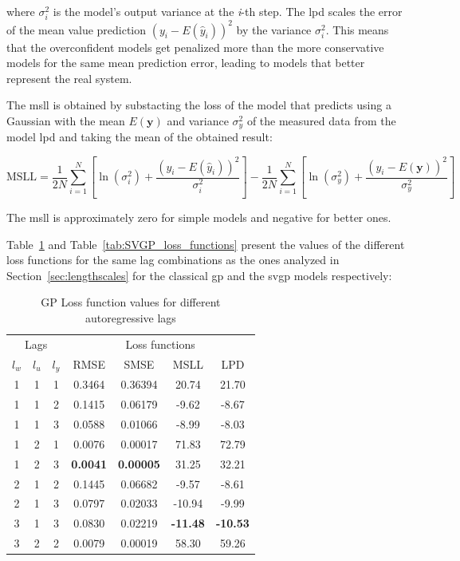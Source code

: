where $\sigma_i^2$ is the model's output variance at the \textit{i}-th step.
The \acrshort{lpd} scales the error of the mean value prediction $\left(y_i -
E(\hat{y}_i)\right)^{2}$ by the variance $\sigma_i^2$. This means that the
overconfident models get penalized more than the more conservative models for
the same mean prediction error, leading to models that better represent
the real system. 

The \acrfull{msll} is obtained by substacting the loss of the model that
predicts using a Gaussian with the mean $E(\boldsymbol{y})$ and variance
$\sigma_y^2$ of the measured data from the model \acrshort{lpd} and taking the
mean of the obtained result:

\begin{equation}
    \text{MSLL} = \frac{1}{2N}\sum_{i=1}^N\left[
        \ln{\left(\sigma_i^2\right) + \frac{\left(y_i -
        E\left(\hat{y}_i\right)\right)^2}{\sigma_i^2}}
    \right] - \frac{1}{2N}\sum_{i=1}^N\left[
        \ln{\left(\sigma_y^2\right) + \frac{\left(y_i -
        E\left(\boldsymbol{y}\right)\right)^2}{\sigma_y^2}}
    \right]
\end{equation}

The \acrshort{msll} is approximately zero for simple models and negative for
better ones.

Table~\ref{tab:GP_loss_functions} and Table~\ref{tab:SVGP_loss_functions}
present the values of the different loss functions for the same lag combinations
as the ones analyzed in Section~\ref{sec:lengthscales} for the classical
\acrshort{gp} and the \acrshort{svgp} models respectively: 

\begin{table}[ht]
\centering
    \begin{tabular}{||c c c|c c c c||}
        \hline
        \multicolumn{3}{||c|}{Lags} & \multicolumn{4}{c||}{Loss functions}\\
        $l_w$ & $l_u$ & $l_y$ & RMSE & SMSE & MSLL & LPD\\
        \hline \hline
        1 & 1 & 1 & 0.3464 & 0.36394 & 20.74 & 21.70 \\
        1 & 1 & 2 & 0.1415 & 0.06179 & -9.62 & -8.67 \\
        1 & 1 & 3 & 0.0588 & 0.01066 & -8.99 & -8.03 \\
        1 & 2 & 1 & 0.0076 & 0.00017 & 71.83 & 72.79 \\
        1 & 2 & 3 & \textbf{0.0041} & \textbf{0.00005} & 31.25 & 32.21 \\
        2 & 1 & 2 & 0.1445 & 0.06682 & -9.57 & -8.61 \\
        2 & 1 & 3 & 0.0797 & 0.02033 & -10.94 & -9.99 \\
        3 & 1 & 3 & 0.0830 & 0.02219 & \textbf{-11.48} & \textbf{-10.53} \\
        3 & 2 & 2 & 0.0079 & 0.00019 & 58.30 & 59.26 \\
        \hline
    \end{tabular}
\caption{GP Loss function values for different autoregressive lags}
\label{tab:GP_loss_functions}
\end{table}

